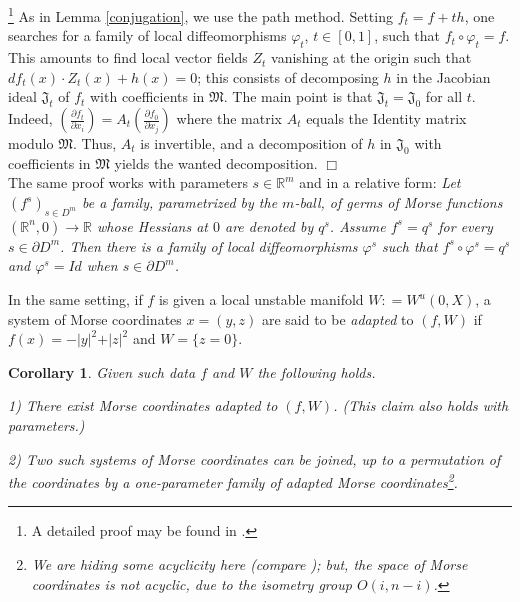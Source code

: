 \documentclass[12pt]{amsart}
\newtheorem{cor}[thm]{Corollary}
\def\R{\mathbb{R}}
\def\vp{\varphi}
\def\nd{\noindent}
\def\bull{\hfill$\Box$\\}
\begin{document}
\nd {\bf Sketch of proof.}\footnote{A detailed proof may be found in \cite{coursx}.} As in Lemma
\ref{conjugation}, we use the path method. Setting $f_t= f+th$, one searches for a family 
of local diffeomorphisms $\vp_t$, $t\in [0,1]$, such that $f_t\circ \vp_t= f$. This amounts
to find local vector fields $Z_t$ vanishing at the origin such that $df_t(x)\cdot Z_t(x)+ h(x)=0$; 
this consists of decomposing $h$ in the Jacobian ideal $\mathfrak J_t$ of $f_t$ with coefficients in 
$\mathfrak M$. The main point is that 
$\mathfrak J_t=\mathfrak J_0$ for all $t$. Indeed, $\left(\frac{\partial f_t}{\partial x_i}\right)= 
A_t\left(\frac{\partial f_0}{\partial x_j}\right)$ where the matrix $A_t$  equals the Identity matrix  %
 modulo $\mathfrak M$.
Thus, $A_t$ is invertible, and  
 a decomposition of $h$ in $\mathfrak J_0$ with coefficients in $\mathfrak M$ yields the 
 wanted decomposition. 
${}$\bull

The same proof works with parameters $s\in \R^m $ and in a relative form: {\it Let
 $\left(f^s\right)_{s\in D^m}$ be 
 a family, parametrized by the $m$-ball, of  germs of Morse functions $(\R^n,0)\to\R$ %
whose Hessians at $0$ are denoted by $q^s$. Assume $f^s=q^s$
for every $s\in \partial D^m$. Then there is a family of local diffeomorphisms  $\vp^s$ such that
$f^s\circ \vp^s=q^s$ and $\vp^s= Id$ when $s\in \partial D^m$.}

In the same setting, if $f$ is given a local unstable manifold $W: =W^u(0, X)$, a system of Morse coordinates $x=(y,z)$ are said to be {\it adapted} to $(f,W)$ if  $f(x)=-\vert y\vert^2+\vert z\vert^2$
and $W=\{z=0\}$.

\begin{cor}\label{unstable-adapted} Given such data $f$ and $W$ the following holds.

1) There exist Morse coordinates adapted to $(f,W)$. (This claim also holds  with parameters.)

2) Two such systems of Morse coordinates can be joined, up to a permutation of the coordinates
by a one-parameter family of adapted Morse coordinates\footnote{We are hiding some acyclicity here
(compare \cite{chenciner}); but, the space of Morse coordinates is not acyclic, due to the isometry group $O(i,n-i)$. }.
\end{cor}
\end{document}
